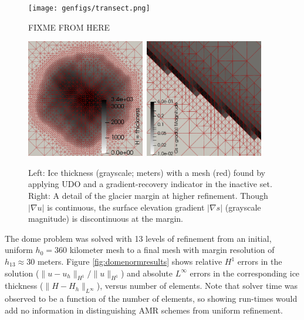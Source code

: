 \documentclass[]{interact}
\theoremstyle{plain}%
\theoremstyle{definition}
\theoremstyle{remark}
\newcommand{\grad}{\nabla}
\begin{document}
\begin{figure}[ht]
\centering

\texttt{[image: genfigs/transect.png]}

FIXME FROM HERE

\mbox{\includegraphics[width=0.46\textwidth]{static/glacier/thickness.png} \qquad \includegraphics[width=0.46\textwidth]{static/glacier/detail.png}}
\caption{Left:  Ice thickness (grayscale; meters) with a mesh (red) found by applying UDO and a gradient-recovery indicator in the inactive set.  Right:  A detail of the glacier margin at higher refinement.  Though $|\grad u|$ is continuous, the surface elevation gradient $|\grad s|$ (grayscale magnitude) is discontinuous at the margin.}
\label{fig:glacier}
\end{figure}

The dome problem was solved with 13 levels of refinement from an initial, uniform $h_0=360$ kilometer mesh to a final mesh with margin resolution of $h_{13}\approx 30$ meters.  Figure \ref{fig:domenormresults} shows relative $H^1$ errors in the solution ($\|u-u_h\|_{H^1}/\|u\|_{H^1}$) and absolute $L^\infty$ errors in the corresponding ice thickness ($\|H-H_h\|_{L^\infty}$), versus number of elements.  Note that solver time was observed to be a function of the number of elements, so showing run-times would add no information in distinguishing AMR schemes from uniform refinement.
\end{document}
